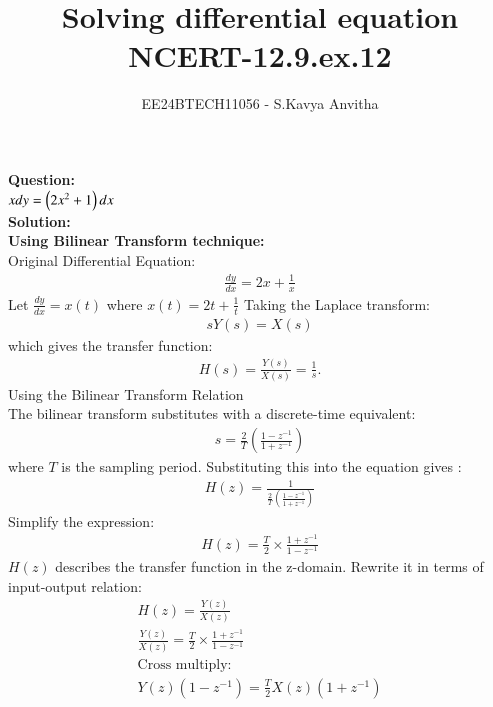 \documentclass[journal]{IEEEtran}
\begin{document}

\vspace{3cm}

\title{Solving differential equation\\NCERT-12.9.ex.12}
\author{EE24BTECH11056 - S.Kavya Anvitha}
\maketitle
\bigskip

\renewcommand{\thefigure}{\theenumi}
\renewcommand{\thetable}{\theenumi}
\textbf{Question:}\\
$xdy = \left(2x^2+1\right)dx$\\
\textbf{Solution:}\\
\textbf{Using Bilinear Transform technique:}\\
Original Differential Equation:
\begin{align}
    \frac{dy}{dx} = 2x + \frac{1}{x}
\end{align}
Let $\frac{dy}{dx} = x(t)$ where $x(t) = 2t + \frac{1}{t}$
Taking the Laplace transform:
\begin{align}
sY(s) = X(s)    
\end{align}
which gives the transfer function:
\begin{align}
H(s) = \frac{Y(s)}{X(s)} = \frac{1}{s}.    
\end{align}
Using the Bilinear Transform Relation\\
The bilinear transform substitutes  with a discrete-time equivalent:
\begin{align}
    s = \frac{2}{T}\left(\frac{1 - z^{-1}}{1 + z^{-1}}\right)
\end{align}
where $T$ is the sampling period. Substituting this into the equation gives :
\begin{align}
   H(z) = \frac{1}{\frac{2}{T}\left(\frac{1 - z^{-1}}{1 + z^{-1}}\right)}
\end{align}
Simplify the expression:
\begin{align}
H(z) = \frac{T}{2} \times \frac{1 + z^{-1}}{1 - z^{-1}}
\end{align}
$H(z)$ describes the transfer function in the z-domain. Rewrite it in terms of input-output relation:
\begin{align}
    H(z) = \frac{Y(z)}{X(z)}\\
\frac{Y(z)}{X(z)} = \frac{T}{2} \times \frac{1 + z^{-1}}{1 - z^{-1}}\\
\text{Cross multiply:}\\
Y(z)\left(1 - z^{-1}\right) = \frac{T}{2} X(z)\left(1 + z^{-1}\right)
\end{align}
\end{document}
